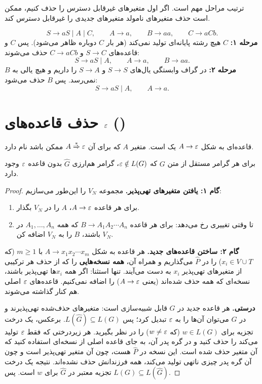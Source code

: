 \begin{warning}
ترتیب مراحل مهم است. اگر اول متغیرهای غیرقابل دسترس را حذف کنیم، ممکن است حذف متغیرهای نامولد متغیرهای جدیدی را غیرقابل دسترس کند.
\end{warning}

\begin{example}
\[S\to aS\mid A\mid C,\qquad A\to a,\qquad B\to aa,\qquad C\to aCb.\]
\textbf{مرحله ۱:} $C$ هیچ رشته پایانه‌ای تولید نمی‌کند (هر بار $C$ دوباره ظاهر می‌شود). پس $C$ و قاعده‌های $S\to C$ و $C\to aCb$ حذف می‌شوند:
\[S\to aS\mid A,\qquad A\to a,\qquad B\to aa.\]
\textbf{مرحله ۲:} در گراف وابستگی یال‌های $S\to S$ و $S\to A$ را داریم و هیچ یالی به $B$ نمی‌رسد. پس $B$ حذف می‌شود:
\[S\to aS\mid A,\qquad A\to a.\]
\end{example}

\section{حذف قاعده‌های $\varepsilon$ ()}

\begin{definition}
قاعده‌ای به شکل $A\to\varepsilon$ یک  است. متغیر $A$ که برای آن $A\overset{*}{\Rightarrow}\varepsilon$ ممکن باشد  نام دارد.
\end{definition}

\begin{theorem}
برای هر گرامر مستقل از متن $G$ که $\varepsilon\notin L(G)$، گرامر هم‌ارزی $\widehat G$ بدون قاعده $\varepsilon$ وجود دارد.
\end{theorem}

\begin{proof}
\textbf{گام ۱: یافتن متغیرهای تهی‌پذیر.} مجموعه $V_N$ را این‌طور می‌سازیم:
\begin{enumerate}
\item برای هر قاعده $A\to\varepsilon$، $A$ را در $V_N$ بگذار.
\item تا وقتی تغییری رخ می‌دهد: برای هر قاعده $B\to A_1A_2\cdots A_n$ که همه $A_1,\dots,A_n$ در $V_N$ باشند، $B$ را به $V_N$ اضافه کن.
\end{enumerate}

\textbf{گام ۲: ساختن قاعده‌های جدید.} هر قاعده به شکل $A\to x_1x_2\cdots x_m$ با $m\ge1$ (که $x_i\in V\cup T$) را در $\widehat P$ می‌گذاریم و همراه آن، \textbf{همه نسخه‌هایی} را که از حذف هر ترکیبی از متغیرهای تهی‌پذیر $x_i$ به دست می‌آیند. تنها استثنا: اگر همه $x_i$ها تهی‌پذیر باشند، نسخه‌ای که همه حذف شده‌اند (یعنی $A\to\varepsilon$) را اضافه نمی‌کنیم. قاعده‌های $\varepsilon$ اصلی هم کنار گذاشته می‌شوند.

\textbf{درستی.} هر قاعده جدید در $G$ قابل شبیه‌سازی است: متغیرهای حذف‌شده تهی‌پذیرند و در $G$ می‌توان آن‌ها را به $\varepsilon$ تبدیل کرد؛ پس $L(\widehat G)\subseteq L(G)$. برعکس، یک درخت تجزیه برای $w\in L(G)$ (که $w\neq\varepsilon$) را در نظر بگیرید. هر زیردرختی که فقط $\varepsilon$ تولید می‌کند را حذف کنید و در گره پدر آن، به جای قاعده اصلی از نسخه‌ای استفاده کنید که آن متغیر حذف شده است. این نسخه در $\widehat P$ هست، چون آن متغیر تهی‌پذیر است و چون آن گره پدر چیزی ناتهی تولید می‌کند، همه فرزندانش حذف نشده‌اند. نتیجه یک درخت تجزیه معتبر در $\widehat G$ برای $w$ است. پس $L(G)\subseteq L(\widehat G)$.
\end{proof}

